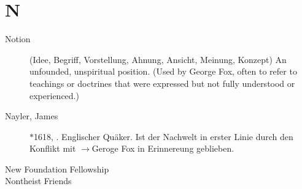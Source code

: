 \section*{N}

\articlesize

\begin{description}

\item[Notion] (Idee, Begriff, Vorstellung, Ahnung, Ansicht, Meinung, Konzept)
    An unfounded, unspiritual position. (Used by George Fox, often to refer to teachings or doctrines that were expressed but not fully understood or experienced.)

 \item[Nayler, James] $\ast$1618, . Englischer Quäker. Ist der Nachwelt in erster Linie durch den Konflikt mit $\to$Geroge Fox in Erinnereung geblieben.

 \item[New Foundation Fellowship]

 \item[Nontheist Friends]

 \end{description}

\normalsize
